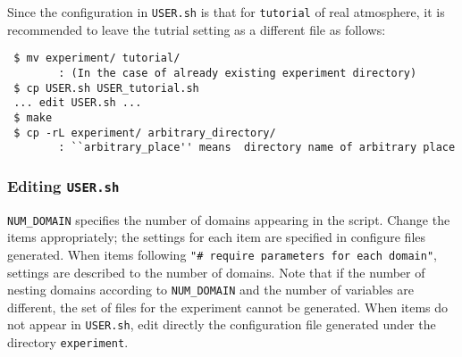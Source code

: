 Since the configuration in \verb|USER.sh| is that for \verb|tutorial| of real atmosphere,
it is recommended to leave the tutrial setting as a different file as follows: 
\begin{verbatim}
 $ mv experiment/ tutorial/    
        : (In the case of already existing experiment directory)
 $ cp USER.sh USER_tutorial.sh
 ... edit USER.sh ...
 $ make
 $ cp -rL experiment/ arbitrary_directory/
        : ``arbitrary_place'' means  directory name of arbitrary place
\end{verbatim}


\subsubsection{Editing \texttt{USER.sh}}

\verb|NUM_DOMAIN| specifies the number of domains appearing in the script.
Change the items appropriately;
the settings for each item are specified in configure files generated.
When items following \verb|"# require parameters for each domain"|, settings are described to the number of domains. Note that if the number of nesting domains according to \verb|NUM_DOMAIN| and the number of variables are different, the set of files for the experiment cannot be generated. When items do not appear in \verb|USER.sh|, edit directly the configuration file generated under the directory \verb|experiment|.
